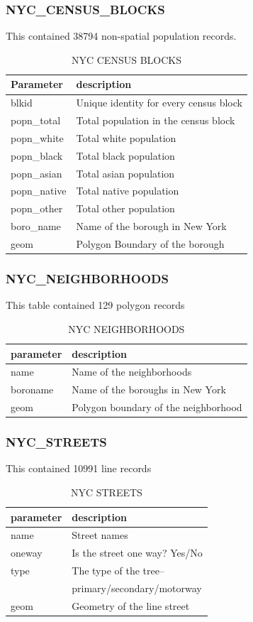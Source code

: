 \documentclass{sig-alternate-05-2015}
\begin{document}
\subsubsection{NYC_CENSUS_BLOCKS}
This contained 38794 non-spatial population records.
\begin{table}[!ht]
\begin{tabular}{ |l|l| }
\hline
Parameter & description\\
\hline
blkid & Unique identity for every census block\\
\hline
popn_total & Total population in the census block\\
\hline
popn_white & Total white population\\
\hline
popn_black & Total black population\\
\hline
popn_asian & Total asian population\\
\hline
popn_native & Total native population\\
\hline
popn_other & Total other population\\
\hline
boro_name & Name of the borough in New York\\
\hline
geom & Polygon Boundary of the borough\\
\hline
\end{tabular}
\caption{NYC CENSUS BLOCKS}
\label{tab:census blocks}
\end{table}

\subsubsection{NYC_NEIGHBORHOODS}
This table contained 129 polygon records
\begin{table}[!ht]
\begin{tabular}{ |l|l| }
\hline
parameter & description\\
\hline
name & Name of the neighborhoods\\
\hline
boroname & Name of the boroughs in New York \\
\hline
geom & Polygon boundary of the neighborhood\\
\hline
\end{tabular}
\caption{NYC NEIGHBORHOODS}
\label{tab: neighborhoods}
\end{table}
\subsubsection{NYC_STREETS}
This contained 10991 line records
\begin{table}[!ht]
\begin{tabular}{ |l|l| }
\hline
parameter & description\\
\hline
name & Street names\\
\hline
oneway & Is the street one way? Yes/No \\
\hline
type & The type of the tree-- \\ \ & primary/secondary/motorway\\
\hline
geom & Geometry of the line street\\
\hline
\end{tabular}
\caption{NYC STREETS}
\label{tab: streets}
\end{table}
\end{document}
